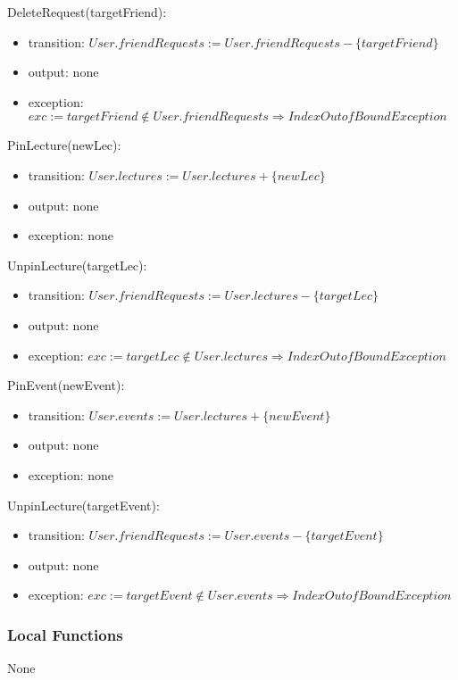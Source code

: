 \documentclass[12pt, titlepage]{article}
\begin{document}
\noindent DeleteRequest(targetFriend):
\begin{itemize}
\item transition: $User.friendRequests := User.friendRequests - \{targetFriend\}$ 
\item output: none
\item exception: $exc := targetFriend \notin User.friendRequests \Rightarrow IndexOutofBound Exception$
\end{itemize}

\noindent PinLecture(newLec):
\begin{itemize}
\item transition: $User.lectures := User.lectures + \{newLec\}$ 
\item output: none
\item exception: none
\end{itemize}

\noindent UnpinLecture(targetLec):
\begin{itemize}
\item transition: $User.friendRequests := User.lectures - \{targetLec\}$ 
\item output: none
\item exception: $exc := targetLec \notin User.lectures \Rightarrow IndexOutofBound Exception$
\end{itemize}

\noindent PinEvent(newEvent):
\begin{itemize}
\item transition: $User.events := User.lectures + \{newEvent\}$ 
\item output: none
\item exception: none
\end{itemize}

\noindent UnpinLecture(targetEvent):
\begin{itemize}
\item transition: $User.friendRequests := User.events - \{targetEvent\}$ 
\item output: none
\item exception: $exc := targetEvent \notin User.events \Rightarrow IndexOutofBound Exception$
\end{itemize}

\subsubsection{Local Functions}

None

\newpage
\end{document}
